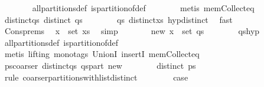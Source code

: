 \begin{isabellebody}
\ \ \ \ \ \ \isamarkupfalse%
\ all{\isacharunderscore}partitions{\isacharunderscore}def\ is{\isacharunderscore}partition{\isacharunderscore}of{\isacharunderscore}def\isanewline
\ \ \ \ \ \ \isamarkupfalse%
\ {\isacharparenleft}metis\ mem{\isacharunderscore}Collect{\isacharunderscore}eq{\isacharparenright}\isanewline
\ \ \ \ \isamarkupfalse%
\ \isamarkupfalse%
\ distinct{\isacharunderscore}qs{\isacharcolon}\ {\isachardoublequoteopen}distinct\ qs{\isachardoublequoteclose}\isanewline
\ \ \ \ \ \ \isamarkupfalse%
\ qs\ distinct{\isacharunderscore}xs\ hyp{\isacharunderscore}distinct\ \isamarkupfalse%
\ fast\isanewline
\ \ \ \ \isanewline
\ \ \ \ \isamarkupfalse%
\ Cons{\isachardot}prems\ \isamarkupfalse%
\ {\isachardoublequoteopen}x\ {\isasymnotin}\ set\ xs{\isachardoublequoteclose}\ \isamarkupfalse%
\ simp\isanewline
\ \ \ \ \isamarkupfalse%
\ \isamarkupfalse%
\ new{\isacharcolon}\ {\isachardoublequoteopen}{\isacharbraceleft}x{\isacharbraceright}\ {\isasymnotin}\ set\ qs{\isachardoublequoteclose}\isanewline
\ \ \ \ \ \ \isamarkupfalse%
\ qs{\isacharunderscore}hyp\isanewline
\ \ \ \ \ \ \isamarkupfalse%
\ all{\isacharunderscore}partitions{\isacharunderscore}def\ is{\isacharunderscore}partition{\isacharunderscore}of{\isacharunderscore}def\isanewline
\ \ \ \ \ \ \isamarkupfalse%
\ {\isacharparenleft}metis\ {\isacharparenleft}lifting{\isacharcomma}\ mono{\isacharunderscore}tags{\isacharparenright}\ UnionI\ insertI{}\ mem{\isacharunderscore}Collect{\isacharunderscore}eq{\isacharparenright}\isanewline
\isanewline
\ \ \ \ \isamarkupfalse%
\ ps{\isacharunderscore}coarser\ distinct{\isacharunderscore}qs\ qs{\isacharunderscore}part\ new\isanewline
\ \ \ \ \ \ \isamarkupfalse%
\ {\isachardoublequoteopen}distinct\ ps{\isachardoublequoteclose}\ \isamarkupfalse%
\ {\isacharparenleft}rule\ coarser{\isacharunderscore}partitions{\isacharunderscore}with{\isacharunderscore}list{\isacharunderscore}distinct{\isacharparenright}\isanewline
\ \ \isamarkupfalse%
\isanewline
\ \ \isamarkupfalse%
\ \isamarkupfalse%
\ {\isacharquery}case\ \isacommand{{\isachardot}{\isachardot}}\isamarkupfalse%
\isanewline
{}\isamarkupfalse%
%
\endisatagproof
{\isafoldproof}%
%
\isadelimproof
%
\endisadelimproof
%
\begin{isamarkuptext}%

\end{isamarkuptext}
\end{isabellebody}
